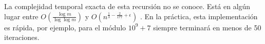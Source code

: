 La complejidad temporal exacta de esta recursión no se conoce. Está en algún lugar entre $O(\frac{\log m}{\log\log m})$ y $O(n^{\frac{1}{3} - \frac{2}{177} + \epsilon})$ . En la práctica, esta implementación es rápida, por ejemplo, para el módulo $10^9 + 7$ siempre terminará en menos de 50 iteraciones.